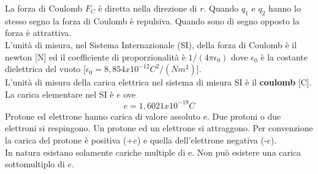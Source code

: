 \documentclass{article}
\begin{document}
La forza di Coulomb $F_C$ è diretta nella direzione di $r$. Quando $q_1$ e $q_2$ hanno lo
stesso segno la forza di Coulomb è repulsiva. Quando sono di segno opposto la
forza è attrattiva.\\
L'unità di misura, nel Sistema Internazionale (SI), della forza di Coulomb è il
newton [N] ed il coefficiente di proporzionalità è $1/(4\pi \epsilon_0)$ dove $\epsilon_0$ è la costante dielettrica del vuoto [$\epsilon_0 = 8,854x10^{-12} C^2/(Nm^2)$].
\vspace*{0.2cm}\\
L'unità di misura della carica elettrica nel sistema di misura SI è il \textbf{coulomb} [C]. La carica elementare nel SI è $e$ ove
\[
    e = 1,6021 x 10^{-19} C
\]
Protone ed elettrone hanno carica di valore assoluto e. Due protoni o
due elettroni si respingono. Un protone ed un elettrone si attraggono.
Per convenzione la carica del protone è positiva ($+e$) e quella dell'elettrone negativa (-$e$).\\
In natura esistano solamente cariche multiple di e. Non può esistere
una carica sottomultiplo di $e$.
\end{document}

